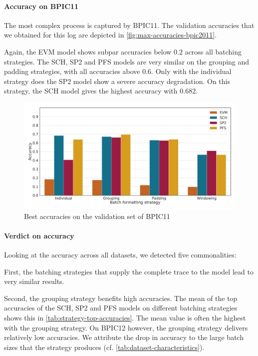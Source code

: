 \paragraph{Accuracy on BPIC11}
The most complex process is captured by BPIC11.
The validation accuracies that we obtained for this log are depicted in \autoref{fig:max-accuracies-bpic2011}.

Again, the EVM model shows subpar accuracies below $0.2$ across all batching strategies.
The SCH, SP2 and PFS models are very similar on the grouping and padding strategies, with all accuracies above $0.6$.
Only with the individual strategy does the SP2 model show a severe accuracy degradation.
On this strategy, the SCH model gives the highest accuracy with $0.682$.

\begin{figure}[!htb]
    \centering
    \includegraphics[width=\textwidth]{gfx/bpic2011/accuracies.pdf}
    \caption{Best accuracies on the validation set of BPIC11}
    \label{fig:max-accuracies-bpic2011}
\end{figure}

\paragraph{Verdict on accuracy}
Looking at the accuracy across all datasets, we detected five commonalities:

First, the batching strategies that supply the complete trace to the model lead to very similar results.

Second, the grouping strategy benefits high accuracies.
The mean of the top accuracies of the SCH, SP2 and PFS models on different batching strategies shows this in \autoref{tab:strategy-top-accuracies}.
The mean value is often the highest with the grouping strategy.
On BPIC12 however, the grouping strategy delivers relatively low accuracies.
We attribute the drop in accuracy to the large batch sizes that the strategy produces (cf. \autoref{tab:dataset-characteristics}).

